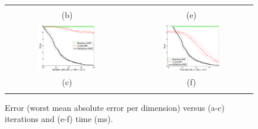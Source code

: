 \documentclass{article} %
\begin{document}
\begin{figure}[t!]
\begin{center}
\begin{tabular}{cc}
\vspace{-1.5mm}
\\
   \hspace{-5mm} \footnotesize(b) 
& \hspace{-4mm} \footnotesize(e) 
\\
\hspace{-5mm} \includegraphics[width=0.49\textwidth,height=0.35\textwidth]{plots1/expectationVsamples_dim50.pdf} 
& \hspace{-3mm} \includegraphics[width=0.49\textwidth,height=0.35\textwidth]{plots1/expectationVtime_dim50.pdf} 
\vspace{-1.5mm}
\\
\hspace{-5mm} \footnotesize(c) 
& \hspace{-4mm} \footnotesize(f) 
\\
\multicolumn{2}{c}{}
\end{tabular}
\end{center}
\vspace{-8mm}
\caption{\footnotesize
Error (worst mean absolute error per dimension) versus (a-c) iterations and (e-f) time (ms). 
} 
\end{figure}
\end{document}
